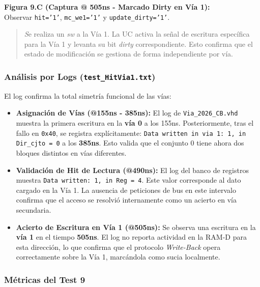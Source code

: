 \documentclass[12pt,a4paper]{article}
\begin{document}
\textbf{Figura 9.C (Captura @ 505ns - Marcado Dirty en Vía 1):} \\
Observar \texttt{hit='1'}, \texttt{mc\_we1='1'} y \texttt{update\_dirty='1'}.
\begin{quote}
\newpage
    \textit Se realiza un \textit{sw} a la Vía 1. La UC activa la señal de escritura específica para la Vía 1 y levanta su bit \textit{dirty} correspondiente. Esto confirma que el estado de modificación se gestiona de forma independiente por vía.
\end{quote}

\subsubsection*{Análisis por Logs (\texttt{test\_HitVia1.txt})}

El log confirma la total simetría funcional de las vías:

\begin{itemize}
    \item \textbf{Asignación de Vías (@155ns - 385ns):} El log de \texttt{Via\_2026\_CB.vhd} muestra la primera escritura en la \textbf{vía 0} a los 155ns. Posteriormente, tras el fallo en \texttt{0x40}, se registra explícitamente: \texttt{Data written in via 1: 1, in Dir\_cjto = 0} a los \textbf{385ns}. Esto valida que el conjunto 0 tiene ahora dos bloques distintos en vías diferentes.
    
    \item \textbf{Validación de Hit de Lectura (@490ns):} El log del banco de registros muestra \texttt{Data written: 1, in Reg = 4}. Este valor corresponde al dato cargado en la Vía 1. La ausencia de peticiones de bus en este intervalo confirma que el acceso se resolvió internamente como un acierto en vía secundaria.
    
    \item \textbf{Acierto de Escritura en Vía 1 (@505ns):} Se observa una escritura en la \textbf{vía 1} en el tiempo \textbf{505ns}. El log no reporta actividad en la RAM-D para esta dirección, lo que confirma que el protocolo \textit{Write-Back} opera correctamente sobre la Vía 1, marcándola como sucia localmente.
\end{itemize}

\subsubsection{Métricas del Test 9}
\end{document}
